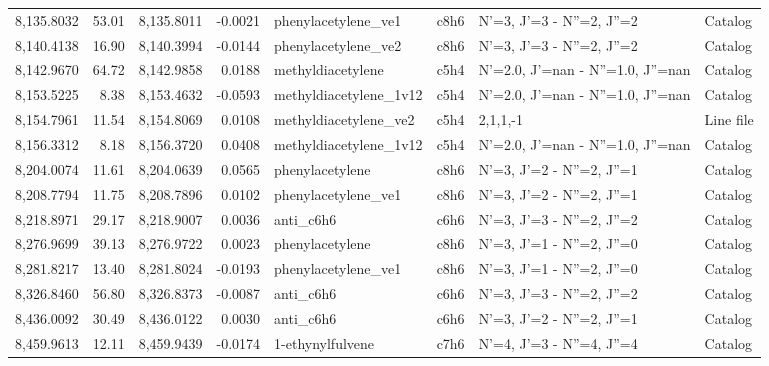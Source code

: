\begin{longtable}{rrrrllll}
 8,135.8032 &     53.01 &        8,135.8011 &   -0.0021 &         phenylacetylene_ve1 &    c8h6 &            N'=3, J'=3 - N''=2, J''=2 &    Catalog \\
 8,140.4138 &     16.90 &        8,140.3994 &   -0.0144 &         phenylacetylene_ve2 &    c8h6 &            N'=3, J'=3 - N''=2, J''=2 &    Catalog \\
 8,142.9670 &     64.72 &        8,142.9858 &    0.0188 &           methyldiacetylene &    c5h4 &    N'=2.0, J'=nan - N''=1.0, J''=nan &    Catalog \\
 8,153.5225 &      8.38 &        8,153.4632 &   -0.0593 &      methyldiacetylene_1v12 &    c5h4 &    N'=2.0, J'=nan - N''=1.0, J''=nan &    Catalog \\
 8,154.7961 &     11.54 &        8,154.8069 &    0.0108 &       methyldiacetylene_ve2 &    c5h4 &                             2,1,1,-1 &  Line file \\
 8,156.3312 &      8.18 &        8,156.3720 &    0.0408 &      methyldiacetylene_1v12 &    c5h4 &    N'=2.0, J'=nan - N''=1.0, J''=nan &    Catalog \\
 8,204.0074 &     11.61 &        8,204.0639 &    0.0565 &             phenylacetylene &    c8h6 &            N'=3, J'=2 - N''=2, J''=1 &    Catalog \\
 8,208.7794 &     11.75 &        8,208.7896 &    0.0102 &         phenylacetylene_ve1 &    c8h6 &            N'=3, J'=2 - N''=2, J''=1 &    Catalog \\
 8,218.8971 &     29.17 &        8,218.9007 &    0.0036 &                   anti_c6h6 &    c6h6 &            N'=3, J'=3 - N''=2, J''=2 &    Catalog \\
 8,276.9699 &     39.13 &        8,276.9722 &    0.0023 &             phenylacetylene &    c8h6 &            N'=3, J'=1 - N''=2, J''=0 &    Catalog \\
 8,281.8217 &     13.40 &        8,281.8024 &   -0.0193 &         phenylacetylene_ve1 &    c8h6 &            N'=3, J'=1 - N''=2, J''=0 &    Catalog \\
 8,326.8460 &     56.80 &        8,326.8373 &   -0.0087 &                   anti_c6h6 &    c6h6 &            N'=3, J'=3 - N''=2, J''=2 &    Catalog \\
 8,436.0092 &     30.49 &        8,436.0122 &    0.0030 &                   anti_c6h6 &    c6h6 &            N'=3, J'=2 - N''=2, J''=1 &    Catalog \\
 8,459.9613 &     12.11 &        8,459.9439 &   -0.0174 &            1-ethynylfulvene &    c7h6 &            N'=4, J'=3 - N''=4, J''=4 &    Catalog \\

\end{longtable}
